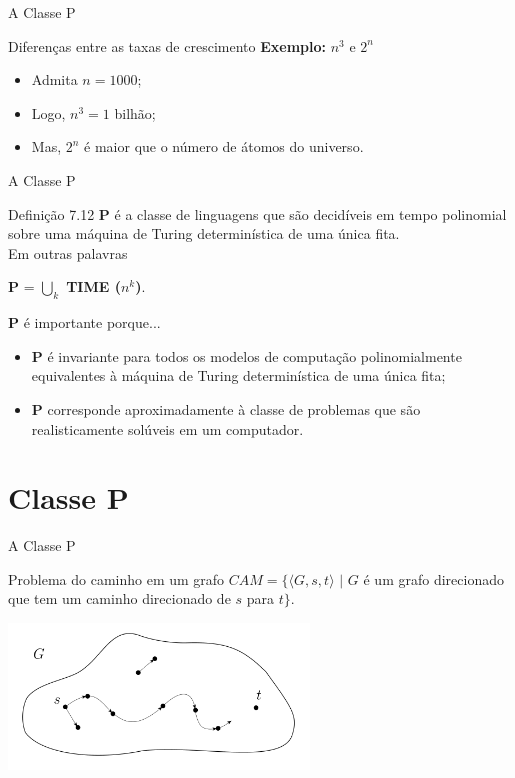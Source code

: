 \documentclass[xcolor=dvipsnames,table]{beamer}
\begin{document}
	\begin{frame}{A Classe P}
		\begin{block}{Diferenças entre as taxas de crescimento}
			{\bf Exemplo:} $n^3$ e $2^n$
			\begin{itemize}
				\item Admita $n = 1000$;
				\item Logo, $n^3 = 1$ bilhão;
				\item Mas, $2^n$ é maior que o número de átomos do universo.
			\end{itemize}
		\end{block}
	\end{frame}
	
	\begin{frame}{A Classe P}
		\begin{block}{Definição 7.12}
			{\bf P} é a classe de linguagens que são decidíveis em tempo polinomial sobre uma máquina de Turing determinística de uma única fita. \\Em outras palavras
			\begin{center}
				{\bf P} = $\bigcup\limits_{k}$ {\bf TIME ($n^k$)}.
			\end{center}
		\end{block}
		\begin{block}{{\bf P} é importante porque...}
			\begin{itemize} 
				\item {\bf P} é invariante para todos os modelos de computação polinomialmente equivalentes à máquina de Turing determinística de uma única fita;
				\item {\bf P} corresponde aproximadamente à classe de problemas que são realisticamente solúveis em um computador.
			\end{itemize}
		\end{block}
	\end{frame}
	
	\section{Classe P}
	
	\begin{frame}{A Classe P}
		\begin{block}{Problema do caminho em um grafo}
			$CAM = \{ \langle G, s, t \rangle \mbox{ | } G$ é um grafo direcionado que tem um caminho direcionado de $s$ para $t \}$.
		\end{block} \pause
		\begin{center}
			\includegraphics[width=8cm]{images/cam.png}
		\end{center}
	\end{frame}
	
\end{document}
